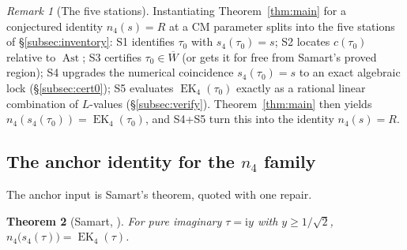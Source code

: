 \documentclass[11pt]{article}
\newcommand{\ii}{\mathrm{i}}
\DeclareMathOperator{\EK}{EK}
\DeclareMathOperator{\Ast}{Ast}
\newtheorem{theorem}{Theorem}[section]
\theoremstyle{definition}
\theoremstyle{remark}
\newtheorem{remark}[theorem]{Remark}
\begin{document}
\begin{remark}[The five stations]\label{rem:stations}
Instantiating Theorem~\ref{thm:main} for a conjectured identity
$n_4(s)=R$ at a CM parameter splits into the five stations of
\S\ref{subsec:inventory}: S1 identifies $\tau_0$ with
$s_4(\tau_0)=s$; S2 locates $c(\tau_0)$ relative to $\Ast$; S3
certifies $\tau_0\in\overline W$ (or gets it for free from Samart's
proved region); S4 upgrades the numerical coincidence $s_4(\tau_0)=s$
to an exact algebraic lock (\S\ref{subsec:cert0}); S5 evaluates
$\EK_4(\tau_0)$ exactly as a rational linear combination of
$L$-values (\S\ref{subsec:verify}). Theorem~\ref{thm:main} then
yields $n_4(s_4(\tau_0))=\EK_4(\tau_0)$, and S4+S5 turn this into
the identity $n_4(s)=R$.
\end{remark}

\subsection{The anchor identity for the \texorpdfstring{$n_4$}{n4}
family}\label{subsec:anchor}

The anchor input is Samart's theorem, quoted with one repair.

\begin{theorem}[Samart, {\cite[Prop.~2.1(iii)]{Sa13}}]\label{thm:samart4}
For pure imaginary $\tau=\ii y$ with $y\ge1/\sqrt2$,
$n_4\bigl(s_4(\tau)\bigr)=\EK_4(\tau)$.
\end{theorem}
\end{document}
